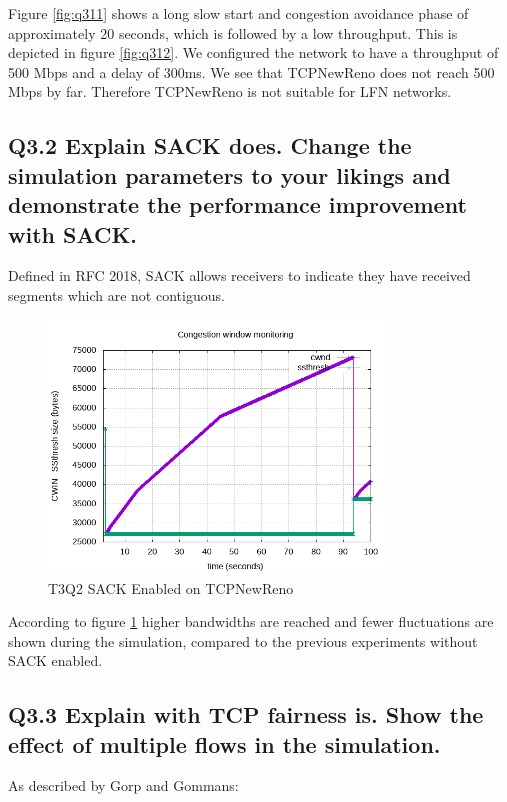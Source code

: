 \documentclass{article}
\begin{document}
Figure \ref{fig:q311} shows a long slow start and congestion avoidance phase of approximately 20 seconds, which is followed by a low throughput. This is depicted in figure \ref{fig:q312}.
We configured the network to have a throughput of 500 Mbps and a delay of 300ms. We see that TCPNewReno does not reach 500 Mbps by far. Therefore TCPNewReno is not suitable for LFN networks.

\subsection{Q3.2 Explain SACK does. Change the simulation parameters to your likings and demonstrate the performance improvement with SACK.}

Defined in RFC 2018, SACK allows receivers to indicate they have received segments which are not contiguous.

\begin{figure}[H]
	\includegraphics[width=0.8\textwidth]{lab1-group1-task3-question2.png}
	\caption{T3Q2 SACK Enabled on TCPNewReno}
	\label{fig:q32}
\end{figure}

According to figure \ref{fig:q32} higher bandwidths are reached and fewer fluctuations are shown during the simulation, compared to the previous experiments without SACK enabled.


\subsection{Q3.3 Explain with TCP fairness is. Show the effect of multiple flows in the simulation.}

As described by Gorp and Gommans\cite{gg}:
\end{document}
